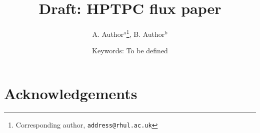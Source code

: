 \documentclass[11pt,a4paper]{article}
\begin{document}
\title{Draft: HPTPC flux paper}
\author{A. Author$^{\textrm{a}}$\thanks{Corresponding author, \texttt{address@rhul.ac.uk}}{}, B. Author$^{\textrm{b}}$}


\date{Keywords: To be defined}

\begin{abstract}

\end{abstract}



\maketitle
\linenumbers











\newenvironment{acknowledgement}{\relax}{\relax}
\begin{acknowledgement}
\section*{Acknowledgements}

\end{acknowledgement}


\AtNextBibliography{\small}
\end{document}
